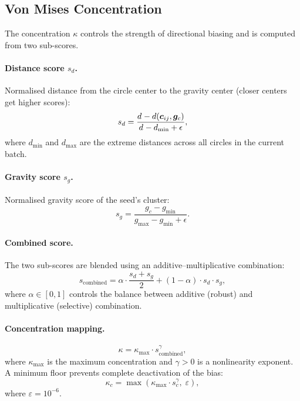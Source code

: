 \subsection{Von Mises Concentration}

The concentration $\kappa$ controls the strength of directional biasing and is computed from two sub-scores.

\paragraph{Distance score $s_d$.} Normalised distance from the circle center to the gravity center (closer centers get higher scores):
\begin{equation}
    s_d = \frac{d_{} - d(\bm{c}_{ij}, \bm{g}_c)}{d_{} - d_{\min} + \epsilon},
    \label{eq:s_d}
\end{equation}
where $d_{\min}$ and $d_{\max}$ are the extreme distances across all circles in the current batch.

\paragraph{Gravity score $s_g$.} Normalised gravity score of the seed's cluster:
\begin{equation}
    s_g = \frac{g_c - g_{\min}}{g_{\max} - g_{\min} + \epsilon}.
    \label{eq:s_g}
\end{equation}

\paragraph{Combined score.} The two sub-scores are blended using an additive--multiplicative combination:
\begin{equation}
    s_{\text{combined}} = \alpha \cdot \frac{s_d + s_g}{2} + (1 - \alpha) \cdot s_d \cdot s_g,
    \label{eq:s_combined}
\end{equation}
where $\alpha \in [0, 1]$ controls the balance between additive (robust) and multiplicative (selective) combination.

\paragraph{Concentration mapping.}
\begin{equation}
    \kappa = \kappa_{\max} \cdot s_{\text{combined}}^{\gamma},
    \label{eq:kappa}
\end{equation}
where $\kappa_{\max}$ is the maximum concentration and $\gamma > 0$ is a nonlinearity exponent.
A minimum floor prevents complete deactivation of the bias:
\begin{equation}
    \kappa_c = \max\!\left(\kappa_{\max} \cdot s_c^{\gamma},\; \varepsilon\right),
    \label{eq:kappa_floor}
\end{equation}
where $\varepsilon = 10^{-6}$.

